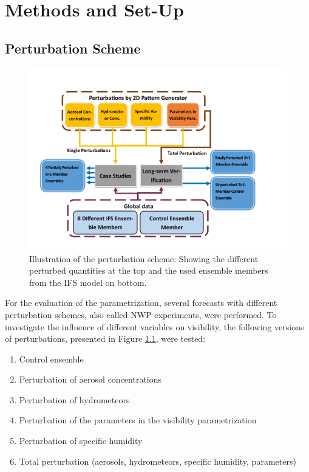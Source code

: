 \chapter{Methods and Set-Up}
\label{sec:methods}
\section{Perturbation Scheme}
\begin{figure}
    \centering
    \includegraphics[width=\textwidth]{graphics/Perturbationsscheme.png}
    \caption[Illustration of Perturbation Scheme]{Illustration of the perturbation scheme: Showing the different perturbed quantities at the top and the used ensemble members from the IFS model on bottom. }
    \label{fig:pertrubation_scheme}
\end{figure}
For the evaluation of the parametrization, several forecasts with different perturbation schemes, also called NWP experiments, were performed.
To investigate the influence of different variables on visibility, the following versions of perturbations, presented in Figure \ref{fig:pertrubation_scheme}, were tested:
\begin{enumerate}
    \item{Control ensemble}
    \item {Perturbation of aerosol concentrations}
    \item {Perturbation of hydrometeors}
    \item {Perturbation of the parameters in the visibility parametrization}
    \item {Perturbation of specific humidity}
    \item {Total perturbation (aerosols, hydrometeors, specific humidity, parameters) }
    
\end{enumerate}
